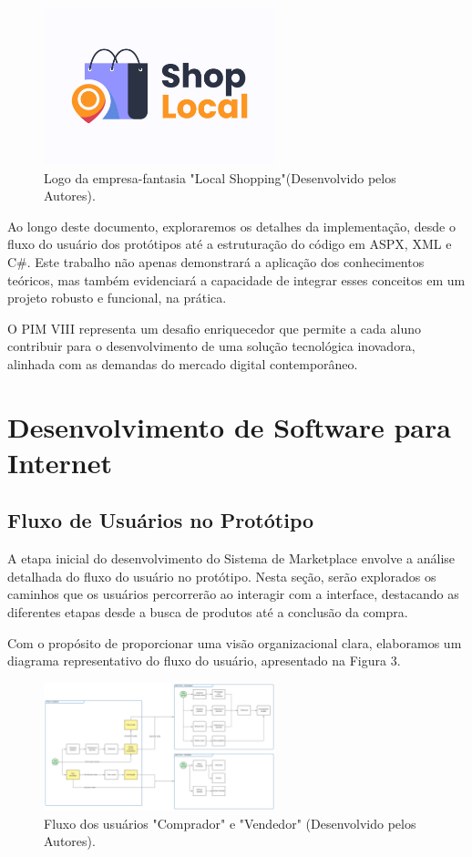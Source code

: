 \documentclass[
	12pt,				%
	openright,			%
	twoside,			%
	a4paper,			%
	english,			%
	brazil				%
	]{abntex2}
\begin{document}
\begin{figure}[htb]
	\centering
	\includegraphics[width=0.6\textwidth]{img/localshopping-logo}
	\caption{Logo da empresa-fantasia "Local Shopping"(Desenvolvido pelos Autores).}
	\label{fig:logo-local-shopping}
\end{figure}

Ao longo deste documento, exploraremos os detalhes da implementação, desde o fluxo do usuário dos protótipos até a estruturação do código em ASPX, XML e C#. Este trabalho não apenas demonstrará a aplicação dos conhecimentos teóricos, mas também evidenciará a capacidade de integrar esses conceitos em um projeto robusto e funcional, na prática.

O PIM VIII representa um desafio enriquecedor que permite a cada aluno contribuir para o desenvolvimento de uma solução tecnológica inovadora, alinhada com as demandas do mercado digital contemporâneo.

\chapter{Desenvolvimento de Software para Internet}\label{cap_dev_sof_int}

\section{Fluxo de Usuários no Protótipo}

A etapa inicial do desenvolvimento do Sistema de Marketplace envolve a análise detalhada do fluxo do usuário no protótipo. Nesta seção, serão explorados os caminhos que os usuários percorrerão ao interagir com a interface, destacando as diferentes etapas desde a busca de produtos até a conclusão da compra.

Com o propósito de proporcionar uma visão organizacional clara, elaboramos um diagrama representativo do fluxo do usuário, apresentado na Figura 3.

\begin{figure}[htb]
    \centering
    \includegraphics[width=0.6\textwidth]{img/User-Flow}
    \caption{Fluxo dos usuários "Comprador" e "Vendedor" (Desenvolvido pelos Autores).}
    \label{fig:diagrama-user-flow}
\end{figure}
\end{document}
